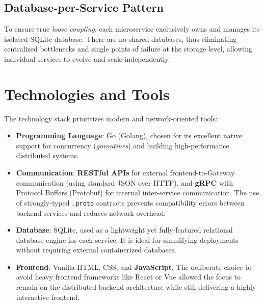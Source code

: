 \documentclass[12pt,a4paper]{article}
\begin{document}
\subsection{Database-per-Service Pattern}
To ensure true \textit{loose coupling}, each microservice exclusively owns and manages its isolated SQLite database. There are no shared databases, thus eliminating centralized bottlenecks and single points of failure at the storage level, allowing individual services to evolve and scale independently.

\section{Technologies and Tools}
The technology stack prioritizes modern and network-oriented tools:
\begin{itemize}
    \item \textbf{Programming Language}: Go (Golang), chosen for its excellent native support for concurrency (\textit{goroutines}) and building high-performance distributed systems.
    \item \textbf{Communication}: \textbf{RESTful APIs} for external frontend-to-Gateway communication (using standard JSON over HTTP), and \textbf{gRPC} with Protocol Buffers (Protobuf) for internal inter-service communication. The use of strongly-typed \texttt{.proto} contracts prevents compatibility errors between backend services and reduces network overhead.
    \item \textbf{Database}: SQLite, used as a lightweight yet fully-featured relational database engine for each service. It is ideal for simplifying deployments without requiring external containerized databases.
    \item \textbf{Frontend}: Vanilla HTML, CSS, and \textbf{JavaScript}. The deliberate choice to avoid heavy frontend frameworks like React or Vue allowed the focus to remain on the distributed backend architecture while still delivering a highly interactive frontend.
\end{itemize}
\end{document}
